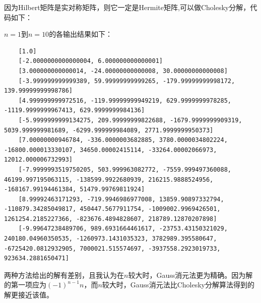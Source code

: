 \documentclass[a4paper]{article}
\begin{document}
\begin{enumerate}
因为Hilbert矩阵是实对称矩阵，则它一定是Hermite矩阵,可以做Cholesky分解，代码如下：



$n=1$到$n=10$的各输出结果如下：

\begin{lstlisting}
    [1.0]
    [-2.0000000000000004, 6.000000000000001]
    [3.000000000000014, -24.00000000000008, 30.00000000000008]
    [-3.999999999999389, 59.99999999999265, -179.99999999998172, 139.99999999998786]
    [4.999999999972516, -119.99999999949219, 629.9999999978285, -1119.9999999967413, 629.9999999984136]
    [-5.9999999999134275, 209.99999999822688, -1679.9999999909319, 5039.999999981689, -6299.999999984089, 2771.9999999950373]
    [7.00000000946784, -336.0000003682885, 3780.0000034802224, -16800.000013330107, 34650.00002415114, -33264.00002066973, 12012.000006732993]
    [-7.9999993519750205, 503.999963082772, -7559.999497360088, 46199.997195063115, -138599.9922680939, 216215.9888524956, -168167.99194461384, 51479.99769811924]
    [8.99992463171293, -719.9946986977008, 13859.90897332794, -110879.34285049817, 450447.5677911754, -1009002.9969426501, 1261254.2185227366, -823676.4894828607, 218789.12870207898]
    [-9.99647238489706, 989.6931664461617, -23753.43150321029, 240180.04960350535, -1260973.1431035323, 3782989.395580647, -6725420.0812932905, 7000021.515574697, -3937558.2923019733, 923634.2881650471]
\end{lstlisting}

两种方法给出的解有差别，且我认为在$n$较大时，Gauss消元法更为精确。因为解的第一项应为$(-1)^{n-1}n$，而$n$较大时，Gauss消元法比Cholesky分解算法得到的解更接近该值。

\end{enumerate}
\end{document}
